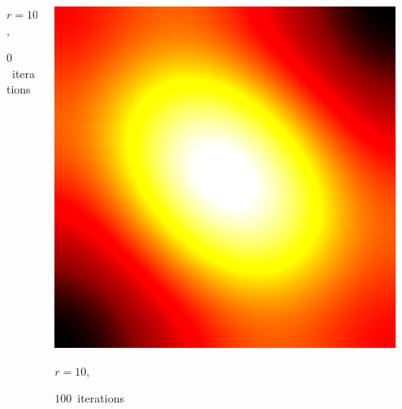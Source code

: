 \documentclass[aspectratio=169,t]{beamer}
\begin{document}
{\begin{columns}
\begin{column}{0.22\textwidth}
			{\footnotesize
				\par \vspace{-1mm} $r=10$,
				\par \vspace{-1mm} $0$~iterations
			}
		\end{column}
		\begin{column}{0.22\textwidth}
			\centering
			\includegraphics[width=.85\textwidth]{data/synthetic_meshes/square_tesselation_2tri_Dirac_delta_10_v441_f800_funcvals_100iter.png}
			{\footnotesize
				\par \vspace{-1mm} $r=10$,
				\par \vspace{-1mm} $100$~iterations
			}
		\end{column}
		\begin{column}{0.17\textwidth}~\end{column}
	\end{columns}
}
\end{document}
